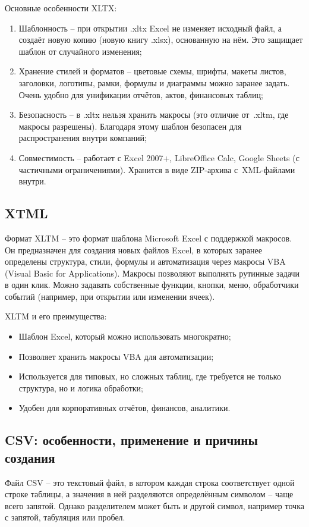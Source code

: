 \documentclass{ou}
\begin{document}
Основные особенности XLTX:
\begin{enumerate}[leftmargin=0em, itemindent=3.75em, nosep, label=\arabic*)]
\item Шаблонность -- при открытии .xltx Excel не изменяет исходный файл, а создаёт новую копию (новую книгу .xlsx), основанную на нём. Это защищает шаблон от случайного изменения;
\item Хранение стилей и форматов -- цветовые схемы, шрифты, макеты листов, заголовки, логотипы, рамки, формулы и диаграммы можно заранее задать. Очень удобно для унификации отчётов, актов, финансовых таблиц;
\item Безопасность -- в .xltx нельзя хранить макросы (это отличие от~.xltm, где макросы разрешены). Благодаря этому шаблон безопасен для распространения внутри компаний;
\item Совместимость -- работает с Excel 2007+, LibreOffice Calc, Google Sheets (с частичными ограничениями). Хранится в виде ZIP-архива с~XML-файлами внутри.
\end{enumerate}
\subsection{XTML}
Формат XLTM -- это формат шаблона Microsoft Excel с поддержкой макросов. Он предназначен для создания новых файлов Excel, в которых заранее определены структура, стили, формулы и автоматизация через макросы VBA (Visual Basic for Applications). Макросы позволяют выполнять рутинные задачи в один клик. Можно задавать собственные функции, кнопки, меню, обработчики событий (например, при открытии или изменении ячеек).

XLTM и его преимущества:
\begin{itemize}[label=-, leftmargin=0em, itemindent=3.35em, nosep]
\item Шаблон Excel, который можно использовать многократно;
\item Позволяет хранить макросы VBA для автоматизации;
\item Используется для типовых, но сложных таблиц, где требуется не только структура, но и логика обработки;
\item Удобен для корпоративных отчётов, финансов, аналитики.
\end{itemize}
\subsection{CSV: особенности, применение и причины создания}
Файл CSV -- это текстовый файл, в котором каждая строка соответствует одной строке таблицы, а значения в ней разделяются определённым символом -- чаще всего запятой. Однако разделителем может быть и другой символ, например точка с запятой, табуляция или пробел.
\end{document}
